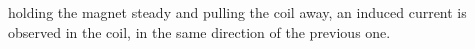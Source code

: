 holding the magnet steady and pulling the coil away, 
an induced current is observed in the coil,
in the same direction of the previous one.